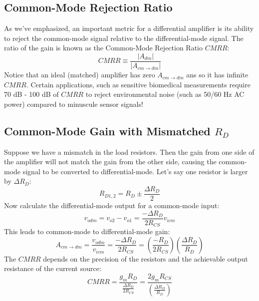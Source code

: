 \subsection{Common-Mode Rejection Ratio}
As we've emphasized, an important metric for a differential amplifier is its ability to reject the common-mode signal relative to the differential-mode signal.  The ratio of the gain is known as the Common-Mode Rejection Ratio $CMRR$:
\begin{equation} 
	CMRR \equiv \frac{{\left| {{A_{dm}}} \right|}}{{\left| {{A_{cm \to dm}}} \right|}}
\end{equation}
Notice that an ideal (matched) amplifier has zero $A_{cm \to dm}$ ans so it has infinite $CMRR$. Certain applications, such as sensitive biomedical measurements require 70 dB - 100 dB of $CMRR$ to reject environmental noise (such as 50/60 Hz AC power) compared to minuscule sensor signals!
\subsection{Common-Mode Gain with Mismatched $R_D$}
Suppose we have a mismatch in the load resistors.  Then the gain from one side of the amplifier will not match the gain from the other side, causing the common-mode signal to be converted to differential-mode.  Let's say one resistor is larger by $\Delta R_{D}$:
\begin{equation} 
	{R_{D1,2}} = {R_D} \pm \frac{\Delta {R_D}}{2}
\end{equation}
Now calculate the differential-mode output for a common-mode input:
\begin{equation}
	{v_{odm}} = {v_{o2}} - {v_{o1}} = \frac{{ - \Delta {R_D}}}{{2{R_{CS}}}}{v_{icm}}
\end{equation}
This leads to common-mode to differential-mode gain:
\begin{equation} 
	{A_{cm\to dm}} = \frac{{{v_{odm}}}}{{{v_{icm}}}} = \frac{{ - \Delta {R_D}}}{{2{R_{CS}}}} = \left( {\frac{{ - {R_D}}}{{2{R_{CS}}}}} \right)\left( {\frac{{\Delta {R_D}}}{{{R_D}}}} \right)
\end{equation}
The $CMRR$  depends on the precision of the resistors and the achievable output resistance of the current source:
\begin{equation} 
	CMRR  = \frac{{{g_m}{R_D}}}{{\frac{{\Delta {R_D}}}{{2{R_{CS}}}}}} = \frac{{2{g_m}{R_{CS}}}}{{\left( {\frac{{\Delta {R_D}}}{{{R_D}}}} \right)}}
\end{equation}

